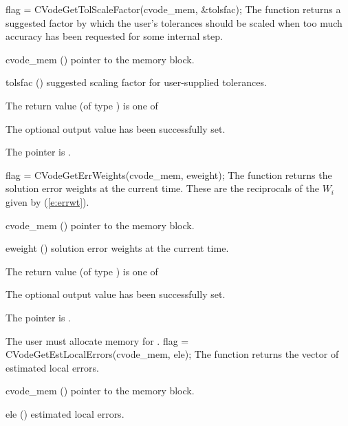 {
  flag = CVodeGetTolScaleFactor(cvode\_mem, \&tolsfac);
}
{
  The function  returns a
  suggested factor by which the user's tolerances 
  should be scaled when too much accuracy has been 
  requested for some internal step.
}
{
  \begin{args}
  \item[cvode\_mem] ()
    pointer to the {\cvodes} memory block.
  \item[tolsfac] ()
    suggested scaling factor for user-supplied tolerances.
  \end{args}
}
{
  The return value  (of type ) is one of
  \begin{args}
  \item[\Id{CV\_SUCCESS}] 
    The optional output value has been successfully set.
  \item[\Id{CV\_MEM\_NULL}]
    The  pointer is .
  \end{args}
}
{}
{
  flag = CVodeGetErrWeights(cvode\_mem, eweight);
}
{
  The function  returns the solution error weights at
  the current time. These are the reciprocals of the $W_i$ given by (\ref{e:errwt}).
}
{
  \begin{args}
  \item[cvode\_mem] ()
    pointer to the {\cvodes} memory block.
  \item[eweight] ()
    solution error weights at the current time.
  \end{args}
}
{
  The return value  (of type ) is one of
  \begin{args}
  \item[\Id{CV\_SUCCESS}] 
    The optional output value has been successfully set.
  \item[\Id{CV\_MEM\_NULL}]
    The  pointer is .
  \end{args}
}
{
  {\warn}The user must allocate memory for .
}
{
  flag = CVodeGetEstLocalErrors(cvode\_mem, ele);
}
{
  The function  returns the
  vector of estimated local errors.
}
{
  \begin{args}
  \item[cvode\_mem] ()
    pointer to the {\cvodes} memory block.
  \item[ele] ()
    estimated local errors.
  \end{args}
}
